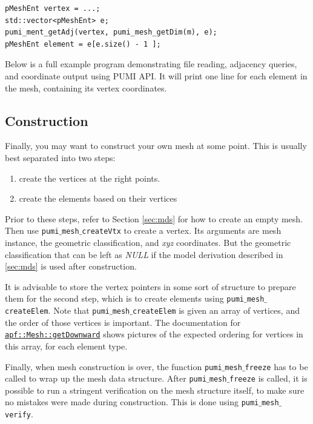 \documentclass{article}
\begin{document}
{\begin{lstlisting}
pMeshEnt vertex = ...;
std::vector<pMeshEnt> e;
pumi_ment_getAdj(vertex, pumi_mesh_getDim(m), e);
pMeshEnt element = e[e.size() - 1 ];
\end{lstlisting}

Below is a full example program demonstrating file reading,
adjacency queries, and coordinate output using PUMI API.
It will print one line for each element in the mesh,
containing its vertex coordinates.



\subsection{Construction}
\label{sec:gen}

Finally, you may want to construct your own mesh at
some point.
This is usually best separated into two steps:
\begin{enumerate}
\item create the vertices at the right points.
\item create the elements based on their vertices
\end{enumerate}

Prior to these steps, refer to Section \ref{sec:mds} for
how to create an empty mesh.
Then use \texttt{pumi$\_$mesh$\_$createVtx} to create a vertex.
Its arguments are mesh instance, the geometric classification, and \emph{xyz} coordinates. But the geometric classification that can be left as \emph{NULL} if the model derivation described
in \ref{sec:mds} is used after construction.

It is advisable to store the vertex pointers in some sort
of structure to prepare them for the second step,
which is to create elements using \texttt{pumi$\_$mesh$\_$createElem}.
Note that \texttt{pumi$\_$mesh$\_$createElem} is given an array
of vertices, and the order of those vertices is important.
The documentation for
\href{http://scorec.rpi.edu/~dibanez/core/classapf_1_1Mesh.html#ae9af2075129ffd4553092049d85b276b}{\texttt{apf::Mesh::getDownward}}
shows pictures of the expected ordering for vertices
in this array, for each element type.

Finally, when mesh construction is over, the function \texttt{pumi$\_$mesh$\_$freeze} has to be called 
to wrap up the mesh data structure.
After \texttt{pumi$\_$mesh$\_$freeze} is called, it is possible to run
a stringent verification on the mesh structure itself,
to make sure no mistakes were made during construction.
This is done using \texttt{pumi$\_$mesh$\_$verify}.

}
\end{document}
